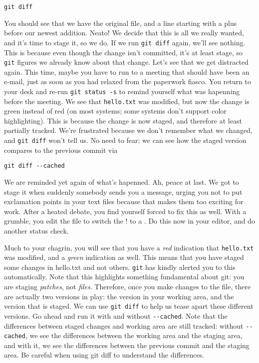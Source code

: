 \begin{verbatim}
git diff
\end{verbatim}

\par{
You should see that we have the original file, and a line starting with a plus
before our newest addition. Neato! We decide that this is all we really
wanted, and it's time to stage it, so we do. If we run \verb+git diff+ again,
we'll see nothing. This is because even though the change isn't committed,
it's at least stage, so \verb+git+ figures we already know about that change.
Let's see that we get distracted again. This time, maybe you have to run to a
meeting that should have been an e-mail, just as soon as you had relaxed from
the paperwork fiasco. You return to your desk and re-run \verb+git status -s+
to remind yourself what was hapenning before the meeting. We see that
\verb+hello.txt+ was modified, but now the change is green instead of red (on
most systems; some systems don't support color highlighting). This is because
the change is now staged, and therefore at least partially tracked. We're
frustrated because we don't remember what we changed, and \verb+git diff+
won't tell us. No need to fear; we can see how the staged version compares to
the previous commit via
}

\begin{verbatim}
git diff --cached
\end{verbatim}

\par{
We are reminded yet again of what's hapenned. Ah, peace at last. We got to
stage it when suddenly somebody sends you a message, urging you not to put
exclamation points in your text files because that makes them too exciting for
work. After a heated debate, you find yourself forced to fix this as well.
With a grumble, you edit the file to switch the ! to a . Do this now in your
editor, and do another status check.
}

\par{
Much to your chagrin, you will see that you have a \emph{red} indication that
\verb+hello.txt+ was modified, and a \emph{green} indication as well. This
means that you have staged some changes in hello.txt and not others.
\verb+git+ has kindly alerted you to this automatically. Note that this
highlights something fundamental about git: you are staging \emph{patches},
not \emph{files}. Therefore, once you make changes to the file, there are
actually two versions in play: the version in your working area, and the
version that is staged. We can use \verb+git diff+ to help us tease apart
these different versions. Go ahead and run it with and without
\verb+--cached+. Note that the differences between staged changes and working
area are still tracked: without \verb+--cached+, we see the differences
between the working area and the staging area, and with it, we see the
differences between the previous commit and the staging area. Be careful when
using git diff to understand the differences. 
}

